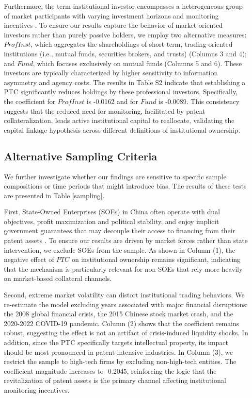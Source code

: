 \documentclass[12pt,a4paper]{article}
\begin{document}
Furthermore, the term institutional investor encompasses a heterogeneous group of market participants with varying investment horizons and monitoring incentives \citep{johnson2010institutional}. To ensure our results capture the behavior of market-oriented investors rather than purely passive holders, we employ two alternative measures: $ProfInst$, which aggregates the shareholdings of short-term, trading-oriented institutions (i.e., mutual funds, securities brokers, and trusts) (Columns 3 and 4); and $Fund$, which focuses exclusively on mutual funds (Columns 5 and 6). These investors are typically characterized by higher sensitivity to information asymmetry and agency costs. The results in Table S2 indicate that establishing a PTC significantly reduces holdings by these professional investors. Specifically, the coefficient for $ProfInst$ is -0.0162  and for $Fund$ is -0.0089. This consistency suggests that the reduced need for monitoring, facilitated by patent collateralization, leads active institutional capital to reallocate, validating the capital linkage hypothesis across different definitions of institutional ownership.

\subsection{Alternative Sampling Criteria}
We further investigate whether our findings are sensitive to specific sample compositions or time periods that might introduce bias. The results of these tests are presented in Table \ref{sampling}.

First, State-Owned Enterprises (SOEs) in China often operate with dual objectives, profit maximization and political stability, and enjoy implicit government guarantees that may decouple their access to financing from their patent assets \citep{jiang2015product}. To ensure our results are driven by market forces rather than state intervention, we exclude SOEs from the sample. As shown in Column (1), the negative effect of $PTC$ on institutional ownership remains significant, indicating that the mechanism is particularly relevant for non-SOEs that rely more heavily on market-based collateral channels.

Second, extreme market volatility can distort institutional trading behaviors. We re-estimate the model excluding years associated with major financial disruptions: the 2008 global financial crisis, the 2015 Chinese stock market crash, and the 2020-2022 COVID-19 pandemic. Column (2) shows that the coefficient remains robust, suggesting the effect is not an artifact of crisis-induced liquidity shocks. In addition, since the PTC specifically targets intellectual property, its impact should be most pronounced in patent-intensive industries. In Column (3), we restrict the sample to high-tech firms by excluding non-high-tech entities. The coefficient magnitude increases to -0.2045, reinforcing the logic that the revitalization of patent assets is the primary channel affecting institutional monitoring incentives.
\end{document}
